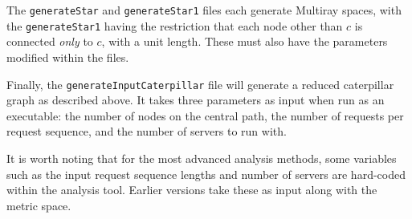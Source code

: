 The \texttt{generateStar} and \texttt{generateStar1} files each generate Multiray spaces, with the \texttt{generateStar1} having the restriction that each node other than $c$ is connected \textit{only} to $c$, with a unit length. These must also have the parameters modified within the files.

Finally, the \texttt{generateInputCaterpillar} file will generate a reduced caterpillar graph as described above. It takes three parameters as input when run as an executable: the number of nodes on the central path, the number of requests per request sequence, and the number of servers to run with. 

It is worth noting that for the most advanced analysis methods, some variables such as the input request sequence lengths and number of servers are hard-coded within the analysis tool. Earlier versions take these as input along with the metric space.